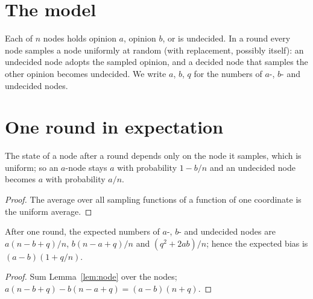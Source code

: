 \section{The model}
\begin{definition}\label{def:usd}
\leanok
Each of $n$ nodes holds opinion $a$, opinion $b$, or is undecided. In a round every node samples a
node uniformly at random (with replacement, possibly itself): an undecided node adopts the sampled
opinion, and a decided node that samples the other opinion becomes undecided. We write $a$, $b$,
$q$ for the numbers of $a$-, $b$- and undecided nodes.
\end{definition}

\section{One round in expectation}
\begin{lemma}\label{lem:node}
\leanok{}
The state of a node after a round depends only on the node it samples, which is uniform; so an
$a$-node stays $a$ with probability $1-b/n$ and an undecided node becomes $a$ with probability $a/n$.
\end{lemma}
\begin{proof}\leanok
The average over all sampling functions of a function of one coordinate is the uniform average.
\end{proof}
\begin{theorem}\label{thm:expect}
\leanok{}
After one round, the expected numbers of $a$-, $b$- and undecided nodes are $a(n-b+q)/n$,
$b(n-a+q)/n$ and $(q^2+2ab)/n$; hence the expected bias is $(a-b)(1+q/n)$.
\end{theorem}
\begin{proof}\leanok
Sum Lemma~\ref{lem:node} over the nodes; $a(n-b+q)-b(n-a+q)=(a-b)(n+q)$.
\end{proof}

